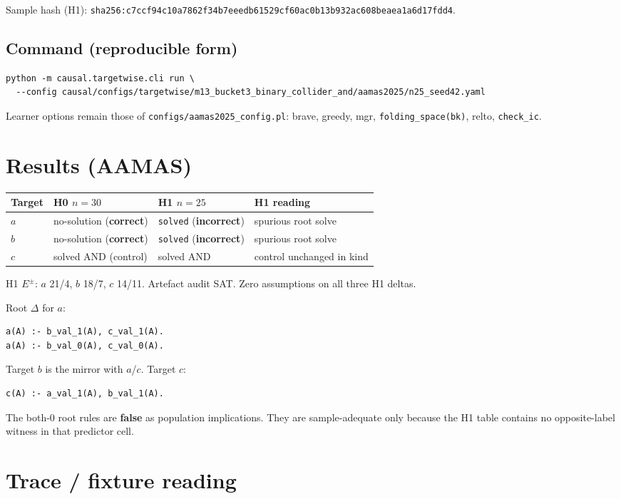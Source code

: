 \documentclass[11pt]{article}
\begin{document}
Sample hash (H1):
\texttt{sha256:c7ccf94c10a7862f34b7eeedb61529cf60ac0b13b932ac608beaea1a6d17fdd4}.

\subsection{Command (reproducible form)}
\begin{verbatim}
python -m causal.targetwise.cli run \
  --config causal/configs/targetwise/m13_bucket3_binary_collider_and/aamas2025/n25_seed42.yaml
\end{verbatim}
Learner options remain those of \texttt{configs/aamas2025\_config.pl}: brave,
greedy, mgr, \texttt{folding\_space(bk)}, relto, \texttt{check\_ic}.

\section{Results (AAMAS)}

\begin{center}
\begin{tabular}{@{}llll@{}}
\toprule
Target & H0 \(n{=}30\) & H1 \(n{=}25\) & H1 reading \\
\midrule
\(a\) & no-solution (\textbf{correct}) &
  \texttt{solved} (\textbf{incorrect}) & spurious root solve \\
\(b\) & no-solution (\textbf{correct}) &
  \texttt{solved} (\textbf{incorrect}) & spurious root solve \\
\(c\) & solved AND (control) & solved AND & control unchanged in kind \\
\bottomrule
\end{tabular}
\end{center}

H1 \(E^\pm\): \(a\) 21/4, \(b\) 18/7, \(c\) 14/11.
Artefact audit SAT. Zero assumptions on all three H1 deltas.

Root \(\Delta\) for \(a\):
\begin{verbatim}
a(A) :- b_val_1(A), c_val_1(A).
a(A) :- b_val_0(A), c_val_0(A).
\end{verbatim}
Target \(b\) is the mirror with \(a\)/\(c\).
Target \(c\):
\begin{verbatim}
c(A) :- a_val_1(A), b_val_1(A).
\end{verbatim}
The both-0 root rules are \textbf{false} as population implications.
They are sample-adequate only because the H1 table contains no opposite-label
witness in that predictor cell.

\section{Trace / fixture reading}
\end{document}
